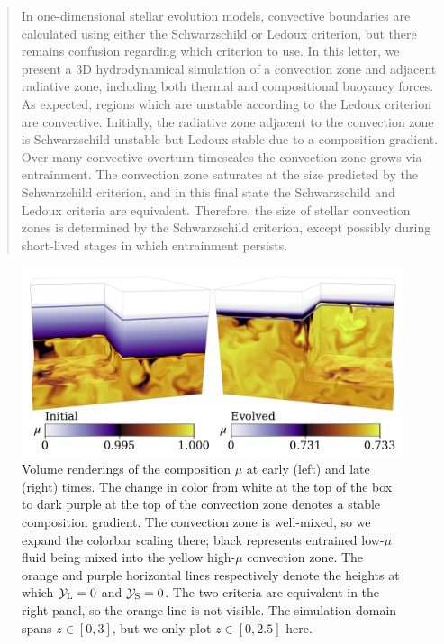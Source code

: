 \documentclass[twocolumn, linenumbers, twocolappendix]{aastex631}
\newcommand{\yL}{\ensuremath{\mathcal{Y}_{\rm{L}}}}
\newcommand{\yS}{\ensuremath{\mathcal{Y}_{\rm{S}}}}
\begin{document}
\begin{abstract}
    In one-dimensional stellar evolution models, convective boundaries are calculated using either the Schwarzschild or Ledoux criterion, but there remains confusion regarding which criterion to use.
    In this letter, we present a 3D hydrodynamical simulation of a convection zone and adjacent radiative zone, including both thermal and compositional buoyancy forces.
    As expected, regions which are unstable according to the Ledoux criterion are convective.
    Initially, the radiative zone adjacent to the convection zone is Schwarzschild-unstable but Ledoux-stable due to a composition gradient.
    Over many convective overturn timescales the convection zone grows via entrainment.
    The convection zone saturates at the size predicted by the Schwarzchild criterion, and in this final state the Schwarzschild and Ledoux criteria are equivalent.
    Therefore, the size of stellar convection zones is determined by the Schwarzschild criterion, except possibly during short-lived stages in which entrainment persists.
\end{abstract}





\begin{figure}[t!]
\centering
\includegraphics[width=\textwidth]{dynamics_figure.pdf}
\caption{
    Volume renderings of the composition $\mu$ at early (left) and late (right) times.
    The change in color from white at the top of the box to dark purple at the top of the convection zone denotes a stable composition gradient.
    The convection zone is well-mixed, so we expand the colorbar scaling there; black represents entrained low-$\mu$ fluid being mixed into the yellow high-$\mu$ convection zone.
    The orange and purple horizontal lines respectively denote the heights at which $\yL = 0$ and $\yS = 0$.
    The two criteria are equivalent in the right panel, so the orange line is not visible.
    The simulation domain spans $z \in [0, 3]$, but we only plot $z \in [0, 2.5]$ here.
\label{fig:dynamics}
}
\end{figure}
\end{document}

